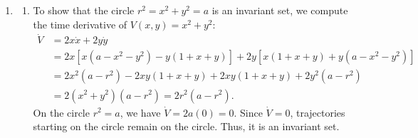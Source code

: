 \documentclass{article}
\begin{document}
\begin{enumerate}[label=\fbox{\arabic*}]
\begin{enumerate}[label=(\arabic*)]
\begin{enumerate}[label=(\roman*)]
            \item We evaluate the norm squared of $h_n = A f_n$:
            \[
              \|A f_n\|^2 = \int_{\mathbb{R}^3} |-\Delta f_n + |x|^2 f_n|^2 \, dx = \|\Delta f_n\|^2 + \||x|^2 f_n\|^2 - 2 \langle \Delta f_n, |x|^2 f_n \rangle.
            \]
            We evaluate the cross term using integration by parts:
            \begin{align*}
              - \langle \Delta f_n, |x|^2 f_n \rangle &= \int_{\mathbb{R}^3} \nabla f_n \cdot \nabla (|x|^2 f_n) \, dx \\
              &= \int_{\mathbb{R}^3} \nabla f_n \cdot (2x f_n + |x|^2 \nabla f_n) \, dx \\
              &= 2 \int_{\mathbb{R}^3} f_n (x \cdot \nabla f_n) \, dx + \int_{\mathbb{R}^3} |x|^2 |\nabla f_n|^2 \, dx.
            \end{align*}
            From part (1), we know $- \int f_n (x \cdot \nabla f_n) \, dx = \frac{3}{2} \|f_n\|^2$. Thus, the first term is $-3 \|f_n\|^2$. The second term is strictly non-negative.
            Therefore, $-2 \langle \Delta f_n, |x|^2 f_n \rangle \ge -6 \|f_n\|^2$.
            Substitute this back:
            \[
              \|h_n\|^2 \ge \|\Delta f_n\|^2 + \||x|^2 f_n\|^2 - 6 \|f_n\|^2 \implies \||x|^2 f_n\|^2 \le \|h_n\|^2 + 6 \|f_n\|^2.
            \]
            Since both $\|h_n\|$ and $\|f_n\|$ are uniformly bounded, the sequence $\{ |x|^2 f_n \}$ is bounded in $L^2$. 
            The subsequence $\{ |x|^2 f_{n(k)} \}$ is therefore bounded and possesses a weakly convergent sub-subsequence converging to some $g \in L^2$.
            Testing against compactly supported functions, it is clear that $g = |x|^2 f$ almost everywhere. Since $g \in L^2$, we conclude $|x|^2 f \in L^2(\mathbb{R}^3)$.
          \end{enumerate}
        \end{enumerate}

  \item %
        \begin{enumerate}[label=(\arabic*)]
          \item To show that the circle $r^2 = x^2 + y^2 = a$ is an invariant set, we compute the time derivative of $V(x, y) = x^2 + y^2$:
          \begin{align*}
            \dot{V} &= 2x\dot{x} + 2y\dot{y} \\
            &= 2x [x(a - x^2 - y^2) - y(1 + x + y)] + 2y [x(1 + x + y) + y(a - x^2 - y^2)] \\
            &= 2x^2(a - r^2) - 2xy(1 + x + y) + 2xy(1 + x + y) + 2y^2(a - r^2) \\
            &= 2(x^2 + y^2)(a - r^2) = 2r^2(a - r^2).
          \end{align*}
          On the circle $r^2 = a$, we have $\dot{V} = 2a(0) = 0$. Since $\dot{V} = 0$, trajectories starting on the circle remain on the circle. Thus, it is an invariant set.
          

\end{enumerate}
\end{enumerate}
\end{document}
